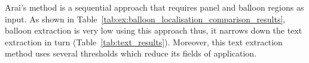 
Arai's method is a sequential approach that requires panel and balloon regions as input.
As shown in Table~\ref{tab:ex:balloon_localisation_comparison_results}, balloon extraction is very low using this approach thus, it narrows down the text extraction in turn (Table~\ref{tab:text_results}).
Moreover, this text extraction method uses several thresholds which reduce its fields of application.


